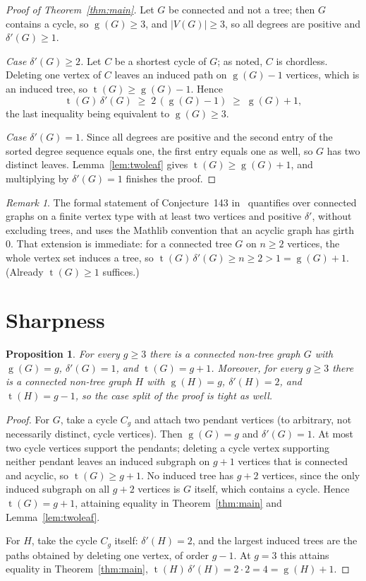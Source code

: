 \documentclass[11pt]{article}
\numberwithin{equation}{section}
\newtheorem{proposition}[theorem]{Proposition}
\theoremstyle{remark}
\newtheorem{remark}[theorem]{Remark}
\newcommand{\tr}{\operatorname{t}}
\newcommand{\gr}{\operatorname{g}}
\newcommand{\dd}{\delta'}
\begin{document}
\begin{proof}[Proof of Theorem~\ref{thm:main}]
Let $G$ be connected and not a tree; then $G$ contains a cycle, so
$\gr(G)\ge3$, and $|V(G)|\ge3$, so all degrees are positive and $\dd(G)\ge1$.

\emph{Case $\dd(G)\ge2$.}  Let $C$ be a shortest cycle of $G$; as noted, $C$
is chordless.  Deleting one vertex of $C$ leaves an induced path on
$\gr(G)-1$ vertices, which is an induced tree, so $\tr(G)\ge\gr(G)-1$.  Hence
\[
  \tr(G)\,\dd(G)\;\ge\;2\,(\gr(G)-1)\;\ge\;\gr(G)+1,
\]
the last inequality being equivalent to $\gr(G)\ge3$.

\emph{Case $\dd(G)=1$.}  Since all degrees are positive and the second entry
of the sorted degree sequence equals one, the first entry equals one as well,
so $G$ has two distinct leaves.  Lemma~\ref{lem:twoleaf} gives
$\tr(G)\ge\gr(G)+1$, and multiplying by $\dd(G)=1$ finishes the proof.
\end{proof}

\begin{remark}
The formal statement of Conjecture~143 in~\cite{FC143} quantifies over
connected graphs on a finite vertex type with at least two vertices and
positive $\dd$, without excluding trees, and uses the Mathlib convention that
an acyclic graph has girth $0$.  That extension is immediate: for a connected
tree $G$ on $n\ge2$ vertices, the whole vertex set induces a tree, so
$\tr(G)\,\dd(G)\ge n\ge2>1=\gr(G)+1$.  (Already $\tr(G)\ge1$ suffices.)
\end{remark}

\section{Sharpness}\label{sec:sharp}

\begin{proposition}\label{prop:sharp}
For every $g\ge3$ there is a connected non-tree graph $G$ with $\gr(G)=g$,
$\dd(G)=1$, and $\tr(G)=g+1$.  Moreover, for every $g\ge3$ there is a
connected non-tree graph $H$ with $\gr(H)=g$, $\dd(H)=2$, and
$\tr(H)=g-1$, so the case split of the proof is tight as well.
\end{proposition}

\begin{proof}
For $G$, take a cycle $C_g$ and attach two pendant vertices (to arbitrary,
not necessarily distinct, cycle vertices).  Then $\gr(G)=g$ and $\dd(G)=1$.
At most two cycle vertices support the pendants; deleting a cycle vertex
supporting neither pendant leaves an induced subgraph on $g+1$ vertices that
is connected and acyclic, so $\tr(G)\ge g+1$.  No induced tree has $g+2$
vertices, since the only induced subgraph on all $g+2$ vertices is $G$
itself, which contains a cycle.  Hence $\tr(G)=g+1$, attaining equality in
Theorem~\ref{thm:main} and Lemma~\ref{lem:twoleaf}.

For $H$, take the cycle $C_g$ itself: $\dd(H)=2$, and the largest induced
trees are the paths obtained by deleting one vertex, of order $g-1$.  At
$g=3$ this attains equality in Theorem~\ref{thm:main},
$\tr(H)\,\dd(H)=2\cdot2=4=\gr(H)+1$.
\end{proof}
\end{document}
